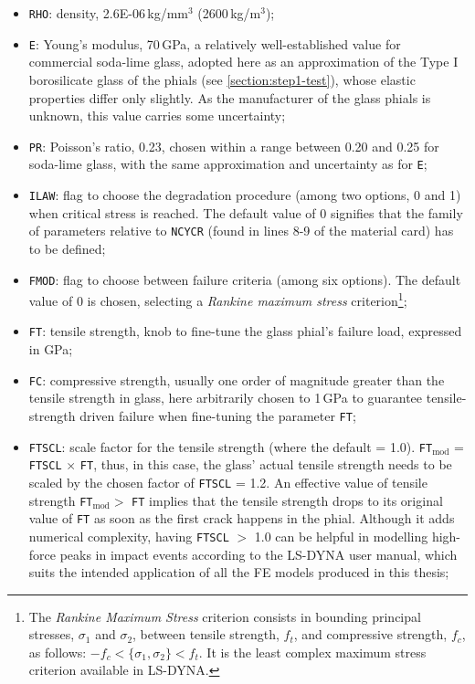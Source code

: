 \begin{itemize}
  \item \texttt{RHO}: density, 2.6E-06\,kg/mm$^3$ (2600\,kg/m$^3$);
  \item \texttt{E}: Young's modulus, 70\,GPa, a relatively well-established value for commercial soda-lime glass, adopted here as an approximation of the Type I borosilicate glass of the phials (see \cref{section:step1-test}), whose elastic properties differ only slightly. As the manufacturer of the glass phials is unknown, this value carries some uncertainty;
  \item \texttt{PR}: Poisson's ratio, 0.23, chosen within a range between 0.20 and 0.25 for soda-lime glass, with the same approximation and uncertainty as for \texttt{E};
  \item \texttt{ILAW}: flag to choose the degradation procedure (among two options, 0 and 1) when critical stress is reached. The default value of 0 signifies that the family of parameters relative to \texttt{NCYCR} (found in lines 8-9 of the material card) has to be defined;
  \item \texttt{FMOD}: flag to choose between failure criteria (among six options). The default value of 0 is chosen, selecting a \textit{Rankine maximum stress} criterion\footnote{The \textit{Rankine Maximum Stress} criterion consists in bounding principal stresses, $\sigma_1$ and $\sigma_2$, between tensile strength, $f_t$, and compressive strength, $f_c$, as follows: $-f_c < \{\sigma_1, \sigma_2\} < f_t$. It is the least complex maximum stress criterion available in LS-DYNA.};
  \item \texttt{FT}: tensile strength, knob to fine-tune the glass phial's failure load, expressed in GPa;
  \item \texttt{FC}: compressive strength, usually one order of magnitude greater than the tensile strength in glass, here arbitrarily chosen to 1\,GPa to guarantee tensile-strength driven failure when fine-tuning the parameter \texttt{FT};
  \item \texttt{FTSCL}: scale factor for the tensile strength (where the default = 1.0). \texttt{FT}$_\text{mod}$ = \texttt{FTSCL} $\times$ \texttt{FT}, thus, in this case, the glass' actual tensile strength needs to be scaled by the chosen factor of \texttt{FTSCL} = 1.2. An effective value of tensile strength \texttt{FT}$_\text{mod} >$ \texttt{FT} implies that the tensile strength drops to its original value of \texttt{FT} as soon as the first crack happens in the phial. Although it adds numerical complexity, having \texttt{FTSCL} $>$ 1.0 can be helpful in modelling high-force peaks in impact events according to the LS-DYNA user manual, which suits the intended application of all the FE models produced in this thesis;   

\end{itemize}
